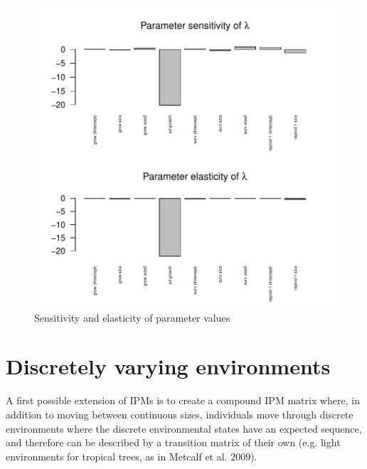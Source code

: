 \documentclass{article}
\begin{document}
\begin{figure}
\begin{center}
\includegraphics{IPMpack_Vignette-fig4a}
\end{center}
\caption{Sensitivity and elasticity of parameter values}
\label{fig:foura}
\end{figure}

\section{Discretely varying environments}
A first possible extension of IPMs is to create a compound IPM matrix where, in addition to moving between continuous sizes, individuals move through discrete environments where the discrete environmental states have an expected sequence, and therefore can be described by a transition matrix of their own (e.g. light environments for tropical trees, as in Metcalf et al. $2009$). 
\end{document}
